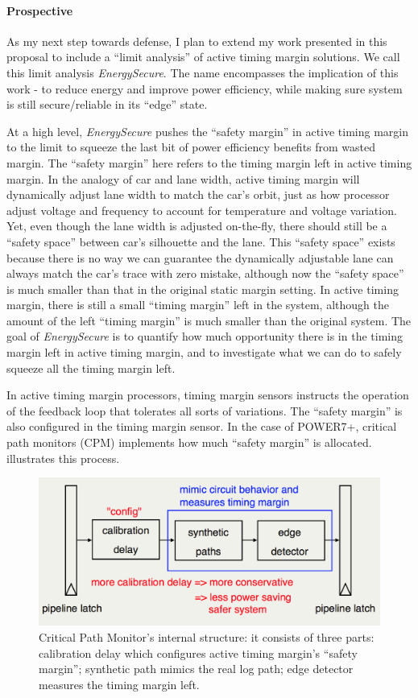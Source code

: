 \paragraph{Prospective} As my next step towards defense, I plan to extend my  work presented in this proposal to include a ``limit analysis'' of active timing margin solutions. We call this limit analysis \textit{EnergySecure}. The name encompasses the implication of this work - to reduce energy and improve power efficiency, while making sure system is still secure/reliable in its ``edge'' state.

At a high level, \textit{EnergySecure} pushes the ``safety margin'' in active timing margin to the limit to squeeze the last bit of power efficiency benefits from wasted margin. The ``safety margin'' here refers to the timing margin left in active timing margin. In the analogy of car and lane width, active timing margin will dynamically adjust lane width to match the car's orbit, just as how processor adjust voltage and frequency to account for temperature and voltage variation. Yet, even though the lane width is adjusted on-the-fly, there should still be a ``safety space'' between car's silhouette and the lane. This ``safety space'' exists because there is no way we can guarantee the dynamically adjustable lane can always match the car's trace with zero mistake, although now the ``safety space'' is much smaller than that in the original static margin setting. In active timing margin, there is still a small ``timing margin'' left in the system, although the amount of the left ``timing margin'' is much smaller than the original system. The goal of \textit{EnergySecure} is to quantify how much opportunity there is in the timing margin left in active timing margin, and to investigate what we can do to safely squeeze all the timing margin left.

In active timing margin processors, timing margin sensors instructs the operation of the feedback loop that tolerates all sorts of variations. The ``safety margin'' is also configured in the timing margin sensor. In the case of POWER7+, critical path monitors (CPM) implements how much ``safety margin'' is allocated.~ illustrates this process.

\begin{figure}[t]
  \centering
  \includegraphics[trim=0 0 0 0, clip, width=0.6\columnwidth]{graphs/cpm-internal.png}
  \caption{Critical Path Monitor's internal structure: it consists of three parts: calibration delay which configures active timing margin's ``safety margin''; synthetic path mimics the real log path; edge detector measures the timing margin left.}
  \label{fig:cpm-internal}
\end{figure}

